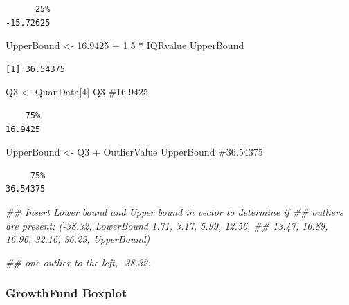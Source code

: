 \documentclass[
  letterpaper,
  DIV=11,
  numbers=noendperiod]{scrreprt}
\newenvironment{Shaded}{\begin{snugshade}}{\end{snugshade}}
\newcommand{\CommentTok}[1]{\textcolor[rgb]{0.37,0.37,0.37}{#1}}
\newcommand{\DecValTok}[1]{\textcolor[rgb]{0.68,0.00,0.00}{#1}}
\newcommand{\DocumentationTok}[1]{\textcolor[rgb]{0.37,0.37,0.37}{\textit{#1}}}
\newcommand{\FloatTok}[1]{\textcolor[rgb]{0.68,0.00,0.00}{#1}}
\newcommand{\NormalTok}[1]{\textcolor[rgb]{0.00,0.23,0.31}{#1}}
\newcommand{\OtherTok}[1]{\textcolor[rgb]{0.00,0.23,0.31}{#1}}
\newcommand{\SpecialCharTok}[1]{\textcolor[rgb]{0.37,0.37,0.37}{#1}}
\begin{document}
\begin{verbatim}
      25% 
-15.72625 
\end{verbatim}

\begin{Shaded}
\begin{Highlighting}[]
\NormalTok{UpperBound }\OtherTok{\textless{}{-}} \FloatTok{16.9425} \SpecialCharTok{+} \FloatTok{1.5} \SpecialCharTok{*}\NormalTok{ IQRvalue}
\NormalTok{UpperBound}
\end{Highlighting}
\end{Shaded}

\begin{verbatim}
[1] 36.54375
\end{verbatim}

\begin{Shaded}
\begin{Highlighting}[]
\NormalTok{Q3 }\OtherTok{\textless{}{-}}\NormalTok{ QuanData[}\DecValTok{4}\NormalTok{]}
\NormalTok{Q3  }\CommentTok{\#16.9425}
\end{Highlighting}
\end{Shaded}

\begin{verbatim}
    75% 
16.9425 
\end{verbatim}

\begin{Shaded}
\begin{Highlighting}[]
\NormalTok{UpperBound }\OtherTok{\textless{}{-}}\NormalTok{ Q3 }\SpecialCharTok{+}\NormalTok{ OutlierValue}
\NormalTok{UpperBound  }\CommentTok{\#36.54375}
\end{Highlighting}
\end{Shaded}

\begin{verbatim}
     75% 
36.54375 
\end{verbatim}

\begin{Shaded}
\begin{Highlighting}[]
\DocumentationTok{\#\# Insert Lower bound and Upper bound in vector to determine if}
\DocumentationTok{\#\# outliers are present: ({-}38.32, LowerBound 1.71, 3.17, 5.99, 12.56,}
\DocumentationTok{\#\# 13.47, 16.89, 16.96, 32.16, 36.29, UpperBound)}

\DocumentationTok{\#\# one outlier to the left, {-}38.32.}
\end{Highlighting}
\end{Shaded}

\subsubsection{GrowthFund Boxplot}\label{growthfund-boxplot}
\end{document}
